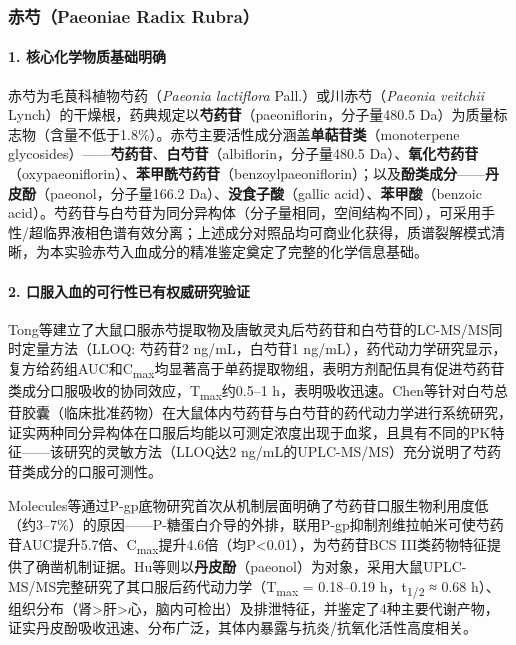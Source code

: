 \documentclass[12pt,a4paper,UTF8,scheme=chinese]{ctexart}
\newcommand{\compoundname}[1]{\textbf{#1}}
\newcommand{\herbname}[1]{\textit{#1}}
\begin{document}
\subsubsection{赤芍（Paeoniae Radix Rubra）}

\paragraph{1. 核心化学物质基础明确}

赤芍为毛茛科植物芍药（\herbname{Paeonia lactiflora} Pall.）或川赤芍（\herbname{Paeonia veitchii} Lynch）的干燥根，药典规定以\compoundname{芍药苷}（paeoniflorin，分子量480.5 Da）为质量标志物（含量不低于1.8\%）。赤芍主要活性成分涵盖\textbf{单萜苷类}（monoterpene glycosides）——\compoundname{芍药苷}、\compoundname{白芍苷}（albiflorin，分子量480.5 Da）、\compoundname{氧化芍药苷}（oxypaeoniflorin）、\compoundname{苯甲酰芍药苷}（benzoylpaeoniflorin）；以及\textbf{酚类成分}——\compoundname{丹皮酚}（paeonol，分子量166.2 Da）、\compoundname{没食子酸}（gallic acid）、\compoundname{苯甲酸}（benzoic acid）。芍药苷与白芍苷为同分异构体（分子量相同，空间结构不同），可采用手性/超临界液相色谱有效分离；上述成分对照品均可商业化获得，质谱裂解模式清晰，为本实验赤芍入血成分的精准鉴定奠定了完整的化学信息基础\cite{Chen2016P}。

\paragraph{2. 口服入血的可行性已有权威研究验证}

Tong等\cite{Tong2010}建立了大鼠口服赤芍提取物及唐敏灵丸后芍药苷和白芍苷的LC-MS/MS同时定量方法（LLOQ: 芍药苷2 ng/mL，白芍苷1 ng/mL），药代动力学研究显示，复方给药组AUC和C\textsubscript{max}均显著高于单药提取物组，表明方剂配伍具有促进芍药苷类成分口服吸收的协同效应，T\textsubscript{max}约0.5--1 h，表明吸收迅速。Chen等\cite{Chen2016P}针对白芍总苷胶囊（临床批准药物）在大鼠体内芍药苷与白芍苷的药代动力学进行系统研究，证实两种同分异构体在口服后均能以可测定浓度出现于血浆，且具有不同的PK特征——该研究的灵敏方法（LLOQ达2 ng/mL的UPLC-MS/MS）充分说明了芍药苷类成分的口服可测性。

Molecules等\cite{Molecules2022}通过P-gp底物研究首次从机制层面明确了芍药苷口服生物利用度低（约3--7\%）的原因——P-糖蛋白介导的外排，联用P-gp抑制剂维拉帕米可使芍药苷AUC提升5.7倍、C\textsubscript{max}提升4.6倍（均P<0.01），为芍药苷BCS III类药物特征提供了确凿机制证据。Hu等\cite{Hu2020}则以\compoundname{丹皮酚}（paeonol）为对象，采用大鼠UPLC-MS/MS完整研究了其口服后药代动力学（T\textsubscript{max} = 0.18--0.19 h，t\textsubscript{1/2} ≈ 0.68 h）、组织分布（肾>肝>心，脑内可检出）及排泄特征，并鉴定了4种主要代谢产物，证实丹皮酚吸收迅速、分布广泛，其体内暴露与抗炎/抗氧化活性高度相关。
\end{document}
